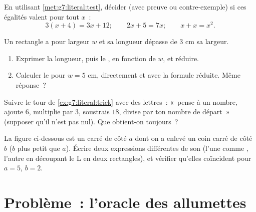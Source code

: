 \begin{exercise}[$\star\star$]\label{exo:g7:literal:8}
En utilisant \cref{met:g7:literal:test}, décider (avec preuve ou
contre-exemple) si ces égalités valent pour tout $x$~:
\[
3(x + 4) = 3x + 12; \qquad
2x + 5 = 7x; \qquad
x + x = x^2 .
\]
\end{exercise}

\begin{exercise}[$\star\star$]\label{exo:g7:literal:9}
Un rectangle a pour largeur $w$ et sa longueur dépasse de $3$ cm sa
largeur.
\begin{enumerate}
  \item Exprimer la longueur, puis le , en fonction de $w$,
        et réduire.
  \item Calculer le  pour $w = 5$ cm, directement et avec la
        formule réduite. Même réponse~?
\end{enumerate}
\end{exercise}

\begin{exercise}[$\star\star$]\label{exo:g7:literal:10}
Suivre le tour de \cref{ex:g7:literal:trick} avec des lettres~:
«~pense à un nombre, ajoute $6$, multiplie par $3$, soustrais $18$,
divise par ton nombre de départ~» (supposer qu'il n'est pas nul). Que
obtient-on toujours~?
\end{exercise}

\begin{exercise}[$\star\star\star$]\label{exo:g7:literal:11}
La figure ci-dessous est un carré de côté $a$ dont on a enlevé un
coin carré de côté $b$ ($b$ plus petit que $a$). Écrire deux
expressions différentes de son  (l'une comme , l'autre
en découpant le L en deux rectangles), et vérifier qu'elles
coïncident pour $a = 5$, $b = 2$.
\end{exercise}

\section{Problème~: l'oracle des allumettes}

